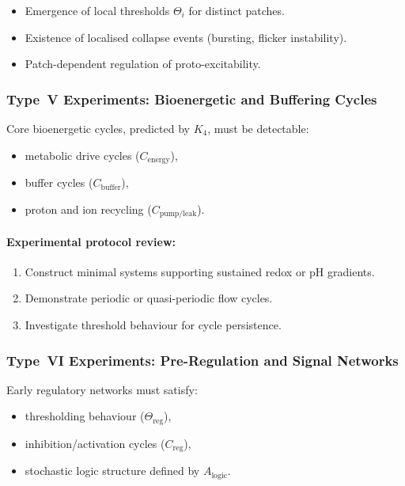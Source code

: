 \begin{itemize}
    \item Emergence of local thresholds $\Theta_i$ for distinct patches.
    \item Existence of localised collapse events (bursting, flicker instability).
    \item Patch-dependent regulation of proto-excitability.
\end{itemize}



\subsubsection{Type~V Experiments: Bioenergetic and Buffering Cycles}

Core bioenergetic cycles, predicted by $K_4$, must be detectable:

\begin{itemize}
    \item metabolic drive cycles ($C_{\mathrm{energy}}$),
    \item buffer cycles ($C_{\mathrm{buffer}}$),
    \item proton and ion recycling ($C_{\mathrm{pump/leak}}$).
\end{itemize}

\paragraph{Experimental protocol review:}

\begin{enumerate}
    \item Construct minimal systems supporting sustained redox or pH gradients.
    \item Demonstrate periodic or quasi-periodic flow cycles.
    \item Investigate threshold behaviour for cycle persistence.
\end{enumerate}



\subsubsection{Type~VI Experiments: Pre-Regulation and Signal Networks}

Early regulatory networks must satisfy:

\begin{itemize}
    \item thresholding behaviour ($\Theta_{\mathrm{reg}}$),
    \item inhibition/activation cycles ($C_{\mathrm{reg}}$),
    \item stochastic logic structure defined by $A_{\mathrm{logic}}$.
\end{itemize}

